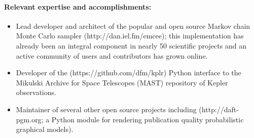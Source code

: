 \documentclass[letterpaper,12pt]{article}
\begin{document}
\paragraph{Relevant expertise and accomplishments:}
\begin{itemize}\setlength{\itemsep}{0pt}
\item
Lead developer and architect of the popular and open source Markov chain
Monte Carlo sampler  (http://dan.iel.fm/emcee); this
implementation has already been an integral component in nearly 50 scientific
projects and an active community of users and contributors has grown online.
\item
Developer of the  (https://github.com/dfm/kplr) Python interface
to the Mikulski Archive for Space Telescopes (MAST) repository of Kepler
observations.
\item
Maintainer of several other open source projects including 
 (http://daft-pgm.org; a Python module for rendering publication quality
probabilistic graphical models).
\end{itemize}
\end{document}
